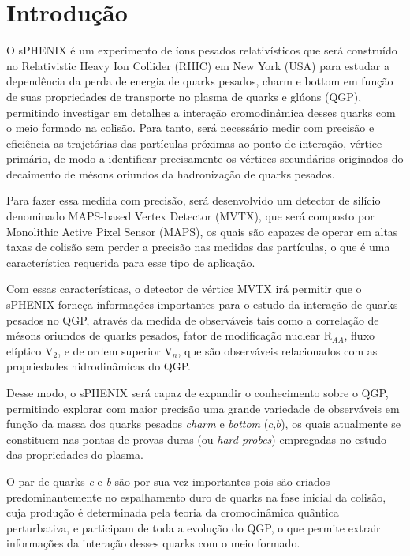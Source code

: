 \chapter{Introdução}

O sPHENIX é um experimento de íons pesados relativísticos que será construído no Relativistic Heavy Ion Collider (RHIC) em New York (USA) para estudar a dependência da perda de energia de quarks pesados, charm e bottom em função de suas propriedades de transporte no plasma de quarks e glúons (QGP), permitindo investigar em detalhes a interação cromodinâmica desses quarks com o meio formado na colisão. Para tanto, será necessário medir com precisão e eficiência as trajetórias das partículas próximas ao ponto de interação, vértice primário, de modo a identificar precisamente os vértices secundários originados do decaimento de mésons oriundos da hadronização de quarks pesados.

Para fazer essa medida com precisão, será desenvolvido um detector de silício denominado MAPS-based Vertex Detector (MVTX), que será composto por Monolithic Active Pixel Sensor (MAPS), os quais são capazes de operar em altas taxas de colisão sem perder a precisão nas medidas das partículas, o que é uma característica requerida para esse tipo de aplicação.    

Com essas características, o detector de vértice MVTX irá permitir que o sPHENIX forneça informações importantes para o estudo da interação de quarks pesados no QGP, através da medida de observáveis tais como a correlação de mésons oriundos de quarks pesados, fator de modificação nuclear R$_{AA}$, fluxo elíptico V$_{2}$, e de ordem superior V$_{n}$, que são observáveis relacionados com as propriedades hidrodinâmicas do QGP.

Desse modo, o sPHENIX será capaz de expandir o conhecimento sobre o QGP, permitindo explorar com maior precisão uma grande variedade de observáveis em função da massa dos quarks pesados \textit{charm} e \textit{bottom} ($c$,$b$), os quais atualmente se constituem nas pontas de provas duras (ou \textit{hard probes}) empregadas no estudo das propriedades do plasma.

O par de quarks \textit{c} e \textit{b} são por sua vez importantes pois são criados predominantemente no espalhamento duro de quarks na fase inicial da colisão, cuja produção é determinada pela teoria da cromodinâmica quântica perturbativa, e participam de toda a evolução do QGP, o que permite extrair informações da interação desses quarks com o meio formado.

